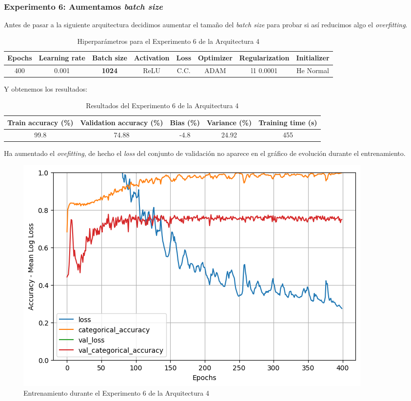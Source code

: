 \documentclass{article}
\begin{document}
        \subsubsection{Experimento 6: Aumentamos \textit{batch size}}
        \label{d-s-a4-e6}
			Antes de pasar a la siguiente arquitectura decidimos aumentar el tama\~no del \textit{batch size} para probar si as\'i reducimos algo el \textit{overfitting}.
			
			\begin{table}[!h]
				\begin{tabular}{|c|c|c|c|c|c|c|c|}
					\textbf{Epochs}&\textbf{Learning rate}&\textbf{Batch size}&\textbf{Activation}&\textbf{Loss}&\textbf{Optimizer}&\textbf{Regularization}  & \textbf{Initializer} \\ \hline
					400 & 0.001 & \textbf{1024} & ReLU & C.C. & ADAM & l1 0.0001 & He Normal
				\end{tabular}
				\caption{Hiperpar\'ametros para el Experimento 6 de la Arquitectura 4}
				\label{tab:hip-d-a4-e6}
			\end{table}
            \newpage
			Y obtenemos los resultados:
			\begin{table}[!h]
				\begin{center}
					\begin{tabular}{| c | c | c | c | c |}
						\textbf{Train accuracy (\%)} & \textbf{Validation accuracy (\%)} & \textbf{Bias (\%)} & \textbf{Variance (\%)} & \textbf{Training time (s)} \\ \hline
						99.8 & 74.88 & -4.8 & 24.92 & 455 \\ \hline
					\end{tabular}
					\caption{Resultados del Experimento 6 de la Arquitectura 4}
					\label{tab:res-d-a4-e6}
				\end{center}
			\end{table}
   
			Ha aumentado el \textit{ovefitting}, de hecho el \textit{loss} del conjunto de validaci\'on no aparece en el gr\'afico de evoluci\'on durante el entrenamiento.
			\begin{figure}[!h]
				\begin{center}
					\includegraphics[scale=0.5]{d-tr-a4-e6.png}		
					\caption{Entrenamiento durante el Experimento 6 de la Arquitectura 4}	
					\label{d-tr-a4-e6}
				\end{center}
			\end{figure}
        \newpage
        
\end{document}
